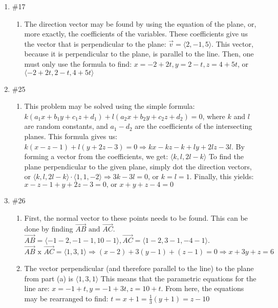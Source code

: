 \documentclass[12pt]{article}
\begin{document}
\begin{enumerate}
    \item \#17 \begin{enumerate}

        \item The direction vector may be found by using the equation of the plane, or, more exactly, the coefficients of the variables. These coefficients give us the vector that is perpendicular to the plane: $\overrightarrow{v}=\langle 2, -1, 5 \rangle$. This vector, because it is perpendicular to the plane, is parallel to the line. Then, one must only use the formula to find: $x=-2+2t, y=2-t, z=4+5t$, or $\langle -2+2t, 2-t, 4+5t \rangle$

    \end{enumerate}

  \item \#25 \begin{enumerate}

      \item This problem may be solved using the simple formula: $k(a_1x+b_1y+c_1z+d_1)+l(a_2x+b_2y+c_2z+d_2)=0$, where $k$ and $l$ are random constants, and $a_1-d_2$ are the coefficients of the intersecting planes. This formula gives us: $k(x-z-1)+l(y+2z-3)=0\Longrightarrow kx-kz-k+ly+2lz-3l$. By forming a vector from the coefficients, we get: $\langle k, l, 2l-k \rangle$ To find the plane perpendicular to the given plane, simply dot the direction vectors, or $\langle k, l, 2l-k \rangle \cdot \langle 1, 1, -2 \rangle\Longrightarrow 3k-3l=0\text{, or } k=l=1$. Finally, this yields: $x-z-1+y+2z-3=0\text{, or } x+y+z-4=0$ 

    \end{enumerate}

    \item \#26 \begin{enumerate}

        \item First, the normal vector to these points needs to be found. This can be done by finding $\overrightarrow{AB}\text{ and } \overrightarrow{AC}$. $\overrightarrow{AB} = \langle -1-2, -1-1, 10-1 \rangle, \overrightarrow{AC} = \langle 1-2, 3-1, -4-1 \rangle$. $\overrightarrow{AB} \text{ x } \overrightarrow{AC} = \langle 1, 3, 1 \rangle \Longrightarrow (x-2)+3(y-1)+(z-1)=0 \Longrightarrow x+3y+z=6$

        \item The vector perpendicular (and therefore parallel to the line) to the plane from part (a) is $\langle 1, 3, 1 \rangle$ This means that the parametric equations for the line are: $x=-1+t, y=-1+3t, z=10+t$. From here, the equations may be rearranged to find: $t=x+1=\frac{1}{3}(y+1)=z-10$


\end{enumerate}
\end{enumerate}
\end{document}
